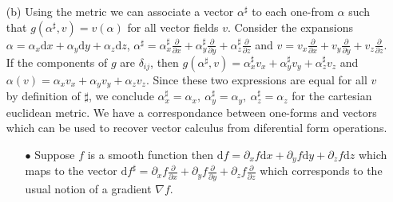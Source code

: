 \documentclass[10pt, a4paper]{article}
\begin{document}
{\begin{enumerate}
\begin{align*}
    &\star \text{d}z = \frac{\sqrt{|1|}}{(3-1)!}(\delta^{-1})^{33}\epsilon_{312} \text{d}x^1 \wedge \text{d}x^2 + \frac{\sqrt{|1|}}{(3-1)!}(\delta^{-1})^{33}\epsilon_{321} \text{d}x^2 \wedge \text{d}x^1 = \frac{1}{2}(+1) \text{d}x^1 \wedge \text{d}x^2 + \frac{1}{2} (-1)(-1) \text{d}x^1 \wedge \text{d}x^2 = \text{d}x^1 \wedge \text{d}x^2
  \end{align*}
  \item[(b)] Using the metric we can associate a vector $\alpha^\sharp$ to each one-from $\alpha$ such that $g(\alpha^\sharp, v) = v(\alpha)$ for all vector fields $v$. Consider the expansions $\alpha = \alpha_x \text{d}x + \alpha_y \text{d}y + \alpha_z \text{d}z$,  $\alpha^\sharp = \alpha^\sharp_x \frac{\partial}{\partial x} + \alpha^\sharp_y \frac{\partial}{\partial y} + \alpha^\sharp_z \frac{\partial}{\partial z}$ and $v = v_x \frac{\partial}{\partial x} + v_y \frac{\partial}{\partial y} + v_z \frac{\partial}{\partial z}$. If the components of $g$ are $\delta_{ij}$, then $g(\alpha^\sharp, v) = \alpha^\sharp_x v_x + \alpha^\sharp_y v_y + \alpha^\sharp_z v_z$ and $\alpha(v) = \alpha_x v_x + \alpha_y v_y + \alpha_z v_z$. Since these two expressions are equal for all $v$ by definition of $\sharp$, we conclude $\alpha^\sharp_x = \alpha_x,\ \alpha^\sharp_y = \alpha_y,\ \alpha^\sharp_z = \alpha_z$ for the cartesian euclidean metric. We have a correspondance between one-forms and vectors which can be used to recover vector calculus from diferential form operations. 
  \begin{enumerate}
    \item[$\bullet$] Suppose $f$ is a smooth function then $\text{d}f = \partial_x f \text{d}x + \partial_y f \text{d}y + \partial_z f \text{d}z$ which maps to the vector $\text{d}f^\sharp = \partial_x f \frac{\partial}{\partial x} + \partial_y f \frac{\partial}{\partial y} + \partial_z f \frac{\partial}{\partial z}$ which corresponds to the usual notion of a gradient $\nabla f$. 
    

\end{enumerate}
\end{enumerate}}
\end{document}
